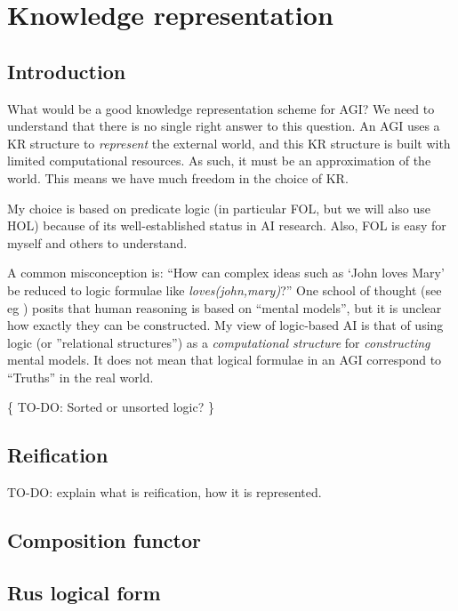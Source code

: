 \chapter{Knowledge representation}
\minitoc

\section{Introduction}

What would be a good knowledge representation scheme for AGI?  We need to understand that there is no single right answer to this question.  An AGI uses a KR structure to \textit{represent} the external world, and this KR structure is built with limited computational resources.  As such, it must be an approximation of the world.  This means we have much freedom in the choice of KR.

My choice is based on predicate logic (in particular FOL, but we will also use HOL) because of its well-established status in AI research.  Also, FOL is easy for myself and others to understand.

A common misconception is:  ``How can complex ideas such as `John loves Mary' be reduced to logic formulae like \textit{loves(john,mary)}?''  One school of thought (see eg \citep*{Johnson-Laird1983}) posits that human reasoning is based on ``mental models'', but it is unclear how exactly they can be constructed.  My view of logic-based AI is that of using logic (or ''relational structures'') as a \textit{computational structure} for \textit{constructing} mental models.  It does not mean that logical formulae in an AGI correspond to ``Truths'' in the real world.

\{ TO-DO:  Sorted or unsorted logic? \}

\section{Reification}
\label{sec:reification}

TO-DO:  explain what is reification, how it is represented.

\section{Composition functor}
\label{sec:CompositionFunctor}

\section{Rus logical form}
\label{sec:Rus-logical-form}

